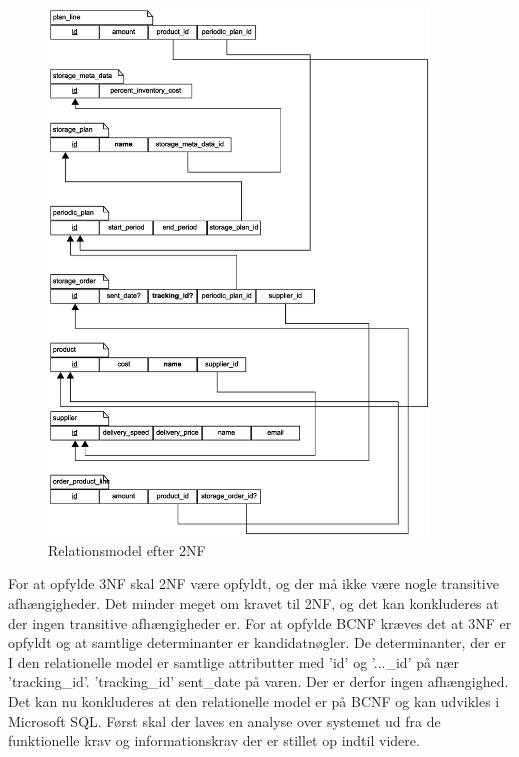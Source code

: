\begin{figure}[H]
    \centering
    \includegraphics[width=0.9\textwidth]{figures/krav/relation_model_1th_normalization.eps}
    \caption{Relationsmodel efter 2NF}
    \label{fig:relational_model_1}
\end{figure}

For at opfylde 3NF skal 2NF være opfyldt, og der må ikke være nogle transitive afhængigheder. Det minder meget om kravet til 2NF, og det kan konkluderes at der ingen transitive afhængigheder er.
For at opfylde BCNF kræves det at 3NF er opfyldt og at samtlige determinanter er kandidatnøgler. De determinanter, der er I den relationelle model er samtlige attributter med 'id' og '...\_id' på nær 'tracking\_id'. 'tracking\_id' sent\_date på varen. Der er derfor ingen afhængighed. 
Det kan nu konkluderes at den relationelle model er på BCNF og kan udvikles i Microsoft SQL. Først skal der laves en analyse over systemet ud fra de funktionelle krav og informationskrav der er stillet op indtil videre. 

